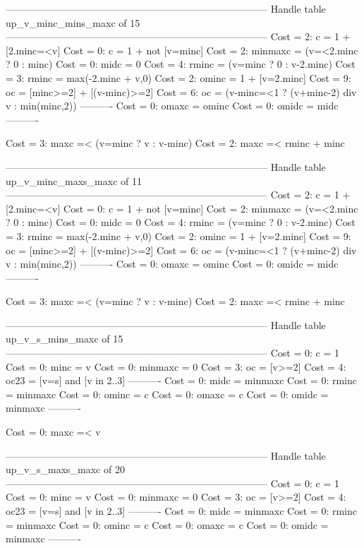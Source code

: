 --------------------------------------------------------------------------------
Handle table up_v_minc_mins_maxc of 15
--------------------------------------------------------------------------------
Cost =  2:  c       = 1 + [2.minc=<v]
Cost =  0:  c       = 1 + not [v=minc]
Cost =  2:  minmaxc = (v=<2.minc ? 0 : minc)
Cost =  0:  midc    = 0
Cost =  4:  rminc   = (v=minc ? 0 : v-2.minc)
Cost =  3:  rminc   = max(-2.minc + v,0)
Cost =  2:  ominc   = 1 + [v=2.minc]
Cost =  9:  oc      = [minc>=2] + [(v-minc)>=2]
Cost =  6:  oc      = (v-minc=<1 ? (v+minc-2) div v : min(minc,2))
----------
Cost =  0:  omaxc   = ominc
Cost =  0:  omidc   = midc
----------

Cost =  3:  maxc =< (v=minc ? v : v-minc)
Cost =  2:  maxc =< rminc + minc

--------------------------------------------------------------------------------
Handle table up_v_minc_maxs_maxc of 11
--------------------------------------------------------------------------------
Cost =  2:  c       = 1 + [2.minc=<v]
Cost =  0:  c       = 1 + not [v=minc]
Cost =  2:  minmaxc = (v=<2.minc ? 0 : minc)
Cost =  0:  midc    = 0
Cost =  4:  rminc   = (v=minc ? 0 : v-2.minc)
Cost =  3:  rminc   = max(-2.minc + v,0)
Cost =  2:  ominc   = 1 + [v=2.minc]
Cost =  9:  oc      = [minc>=2] + [(v-minc)>=2]
Cost =  6:  oc      = (v-minc=<1 ? (v+minc-2) div v : min(minc,2))
----------
Cost =  0:  omaxc   = ominc
Cost =  0:  omidc   = midc
----------

Cost =  3:  maxc =< (v=minc ? v : v-minc)
Cost =  2:  maxc =< rminc + minc

--------------------------------------------------------------------------------
Handle table up_v_s_mins_maxc of 15
--------------------------------------------------------------------------------
Cost =  0:  c       = 1
Cost =  0:  minc    = v
Cost =  0:  minmaxc = 0
Cost =  3:  oc      = [v>=2]
Cost =  4:  oc23    = [v=s] and [v in 2..3]
----------
Cost =  0:  midc    = minmaxc
Cost =  0:  rminc   = minmaxc
Cost =  0:  ominc   = c
Cost =  0:  omaxc   = c
Cost =  0:  omidc   = minmaxc
----------

Cost =  0:  maxc =< v

--------------------------------------------------------------------------------
Handle table up_v_s_maxs_maxc of 20
--------------------------------------------------------------------------------
Cost =  0:  c       = 1
Cost =  0:  minc    = v
Cost =  0:  minmaxc = 0
Cost =  3:  oc      = [v>=2]
Cost =  4:  oc23    = [v=s] and [v in 2..3]
----------
Cost =  0:  midc    = minmaxc
Cost =  0:  rminc   = minmaxc
Cost =  0:  ominc   = c
Cost =  0:  omaxc   = c
Cost =  0:  omidc   = minmaxc
----------

